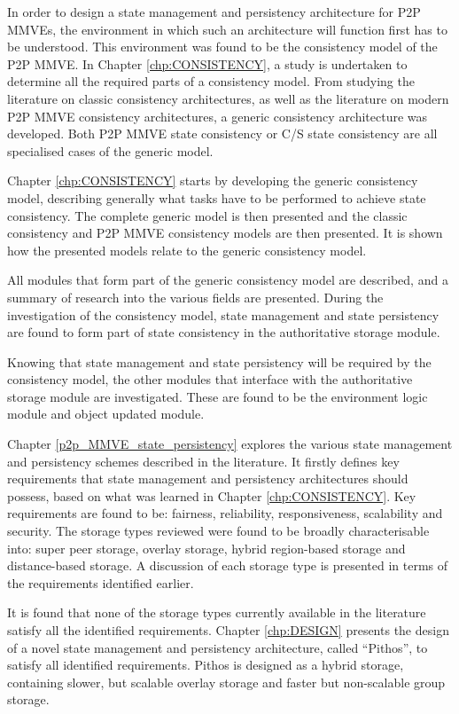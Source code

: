 In order to design a state management and persistency architecture for P2P MMVEs, the environment in which such an architecture will function first has to be understood. This environment was found to be the consistency model of the P2P MMVE. In Chapter \ref{chp:CONSISTENCY}, a study is undertaken to determine all the required parts of a consistency model. From studying the literature on classic consistency architectures, as well as the literature on modern P2P MMVE consistency architectures, a generic consistency architecture was developed. Both P2P MMVE state consistency or C/S state consistency are all specialised cases of the generic model.

Chapter \ref{chp:CONSISTENCY} starts by developing the generic consistency model, describing generally what tasks have to be performed to achieve state consistency. The complete generic model is then presented and the classic consistency and P2P MMVE consistency models are then presented. It is shown how the presented models relate to the generic consistency model.

All modules that form part of the generic consistency model are described, and a summary of research into the various fields are presented. During the investigation of the consistency model, state management and state persistency are found to form part of state consistency in the authoritative storage module.

Knowing that state management and state persistency will be required by the consistency model, the other modules that interface with the authoritative storage module are investigated. These are found to be the environment logic module and object updated module.

Chapter \ref{p2p_MMVE_state_persistency} explores the various state management and persistency schemes described in the literature. It firstly defines key requirements that state management and persistency architectures should possess, based on what was learned in Chapter \ref{chp:CONSISTENCY}. Key requirements are found to be: fairness, reliability, responsiveness, scalability and security. The storage types reviewed were found to be broadly characterisable into: super peer storage, overlay storage, hybrid region-based storage and distance-based storage. A discussion of each storage type is presented in terms of the requirements identified earlier.

It is found that none of the storage types currently available in the literature satisfy all the identified requirements. Chapter \ref{chp:DESIGN} presents the design of a novel state management and persistency architecture, called ``Pithos'', to satisfy all identified requirements. Pithos is designed as a hybrid storage, containing slower, but scalable overlay storage and faster but non-scalable group storage.

